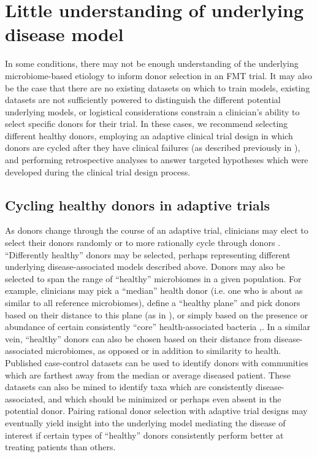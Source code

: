 \section{Little understanding of underlying disease model}

In some conditions, there may not be enough understanding of the underlying microbiome-based etiology to inform donor selection in an FMT trial. It may also be the case that there are no existing datasets on which to train models, existing datasets are not sufficiently powered to distinguish the different potential underlying models, or logistical considerations constrain a clinician's ability to select specific donors for their trial. In these cases, we recommend selecting different healthy donors, employing an adaptive clinical trial design in which donors are cycled after they have clinical failures (as described previously in \cite{Olesen2017}), and performing retrospective analyses to answer targeted hypotheses which were developed during the clinical trial design process.

\subsection{Cycling healthy donors in adaptive trials}

As donors change through the course of an adaptive trial, clinicians may elect to select their donors randomly or to more rationally cycle through donors \cite{Olesen2017}.
``Differently healthy'' donors may be selected, perhaps representing different underlying disease-associated models described above.
Donors may also be selected to span the range of ``healthy'' microbiomes in a given population.
For example, clinicians may pick a ``median'' health donor (i.e. one who is about as similar to all reference microbiomes), define a ``healthy plane'' and pick donors based on their distance to this plane (as in \cite{Halfvarson2017}), or simply based on the presence or abundance of certain consistently ``core'' health-associated bacteria \cite{Shade2011},\cite{Duvallet2017}.
In a similar vein, ``healthy'' donors can also be chosen based on their distance from disease-associated microbiomes, as opposed or in addition to similarity to health. Published case-control datasets can be used to identify donors with communities which are farthest away from the median or average diseased patient.
These datasets can also be mined to identify taxa which are consistently disease-associated, and which should be minimized or perhaps even absent in the potential donor.
Pairing rational donor selection with adaptive trial designs may eventually yield insight into the underlying model mediating the disease of interest if certain types of ``healthy'' donors consistently perform better at treating patients than others.

